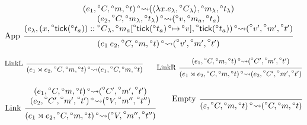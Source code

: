 \documentclass{article}
\theoremstyle{definition}
\newcommand*{\cons}{::}
\newcommand*{\A}[1]{\prescript{\circ}{}{#1}}
\newcommand*{\mem}{m}
\newcommand*{\semarrow}{\rightsquigarrow}
\newcommand*{\link}[2]{{#1}\rtimes{#2}}
\newcommand*{\tick}{\mathsf{tick}}
\begin{document}
\begin{figure}[h!]
  \[
    \begin{prooftree}
      \hypo{
        \begin{matrix}
          (e_{1}, \A{C}, \A\mem, \A{t})
          \A\semarrow
          (\langle\lambda x.e_{\lambda}, \A{C}_{\lambda}\rangle, \A\mem_{\lambda}, \A{t_\lambda}) \\
          (e_{2}, \A{C}, \A\mem_{\lambda}, \A{t_\lambda})
          \A\semarrow
          (\A{v}, \A\mem_{a}, \A{t_a})                                                            \\
          (e_{\lambda}, (x, \A\tick(\A{t_a}))\cons \A{C}_{\lambda}, \A\mem_{a}[\A\tick(\A{t_a})\A\mapsto \A{v}], \A\tick(\A{t_a}))
          \A\semarrow
          (\A{v'}, \A{\mem'},\A{t'})
        \end{matrix}
      }
      \infer[left label={App}]1{
      (e_{1}\:e_{2}, \A{C}, \A\mem, \A{t})
      \A\semarrow
      (\A{v'}, \A{\mem'},\A{t'})
      }
    \end{prooftree}
  \]

  \[
    \begin{prooftree}
      \infer[left label=LinkL]0{
      (\link{e_{1}}{e_{2}}, \A{C}, \A\mem, \A{t})
      \A\semarrow
      (e_{1}, \A{C}, \A\mem, \A{t})
      }
    \end{prooftree}\qquad
    \begin{prooftree}
      \hypo{
        \begin{matrix}
          (e_{1}, \A{C}, \A\mem, \A{t})
          \A\semarrow
          (\A{C'}, \A{\mem'}, \A{t'})
        \end{matrix}
      }
      \infer[left label=LinkR]1{
      (\link{e_{1}}{e_{2}}, \A{C}, \A\mem, \A{t})
      \A\semarrow
      (e_{2}, \A{C'}, \A{\mem'}, \A{t'})
      }
    \end{prooftree}
  \]

  \[
    \begin{prooftree}
      \hypo{
        \begin{matrix}
          (e_{1}, \A{C}, \A\mem, \A{t})
          \A\semarrow
          (\A{C'}, \A{\mem'}, \A{t'}) \\
          (e_{2}, \A{C'}, \A{\mem'}, \A{t'})
          \A\semarrow
          (\A{V}, \A{\mem''}, \A{t''})
        \end{matrix}
      }
      \infer[left label=Link]1{
      (\link{e_{1}}{e_{2}}, \A{C}, \A\mem, \A{t})
      \A\semarrow
      (\A{V}, \A{\mem''}, \A{t''})
      }
    \end{prooftree}\qquad
    \begin{prooftree}
      \infer[left label=Empty]0{
      (\varepsilon, \A{C}, \A\mem, \A{t})
      \A\semarrow
      (\A{C}, \A\mem, \A{t})
      }
    \end{prooftree}
  \]


\end{figure}
\end{document}

